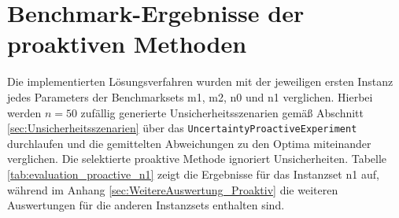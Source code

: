 \section{Benchmark-Ergebnisse der proaktiven Methoden} \label{sec:BenchmarkErgebnisse_NaivMethoden}

Die implementierten Lösungsverfahren wurden mit der jeweiligen ersten Instanz jedes Parameters der Benchmarksets m1, m2, n0 und n1 verglichen. Hierbei werden $n = 50$ zufällig generierte Unsicherheitsszenarien gemäß Abschnitt \ref{sec:Unsicherheitsszenarien} über das \lstinline|UncertaintyProactiveExperiment| durchlaufen und die gemittelten Abweichungen zu den Optima miteinander verglichen. Die selektierte proaktive Methode ignoriert Unsicherheiten. Tabelle \ref{tab:evaluation_proactive_n1} zeigt die Ergebnisse für das Instanzset n1 auf, während im Anhang \ref{sec:WeitereAuswertung_Proaktiv} die weiteren Auswertungen für die anderen Instanzsets enthalten sind. \\

